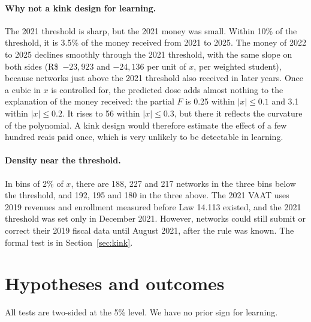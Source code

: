 \documentclass[11pt]{article}
\newcommand{\reais}{R\$}
\begin{document}
\paragraph{Why not a kink design for learning.} The 2021 threshold is sharp, but the 2021 money was small. Within 10\% of the threshold, it is 3.5\% of the money received from 2021 to 2025. The money of 2022 to 2025 declines smoothly through the 2021 threshold, with the same slope on both sides (\reais{}~$-23{,}923$ and $-24{,}136$ per unit of $x$, per weighted student), because networks just above the 2021 threshold also received in later years. Once a cubic in $x$ is controlled for, the predicted dose adds almost nothing to the explanation of the money received: the partial $F$ is 0.25 within $|x| \le 0.1$ and 3.1 within $|x| \le 0.2$. It rises to 56 within $|x| \le 0.3$, but there it reflects the curvature of the polynomial. A kink design would therefore estimate the effect of a few hundred reais paid once, which is very unlikely to be detectable in learning.

\paragraph{Density near the threshold.} In bins of 2\% of $x$, there are 188, 227 and 217 networks in the three bins below the threshold, and 192, 195 and 180 in the three above. The 2021 VAAT uses 2019 revenues and enrollment measured before Law 14.113 existed, and the 2021 threshold was set only in December 2021. However, networks could still submit or correct their 2019 fiscal data until August 2021, after the rule was known. The formal test is in Section~\ref{sec:kink}.

\section{Hypotheses and outcomes}\label{sec:hipoteses}

All tests are two-sided at the 5\% level. We have no prior sign for learning.
\end{document}
